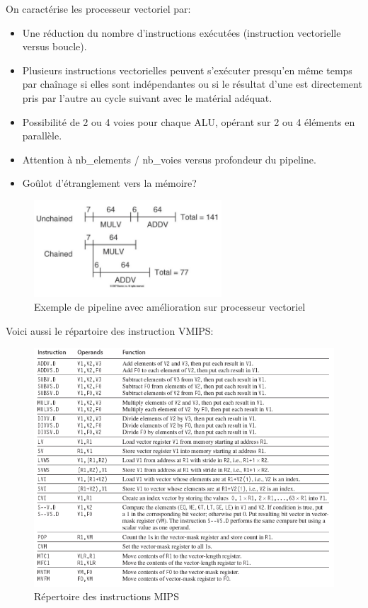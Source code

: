\documentclass[oneside]{book}
\begin{document}
On caractérise les processeur vectoriel par:
\begin{itemize}
\item Une réduction du nombre d'instructions exécutées (instruction vectorielle
versus boucle).

\item Plusieurs instructions vectorielles peuvent s'exécuter presqu'en même
temps par chaînage si elles sont indépendantes ou si le résultat d'une est
directement pris par l'autre au cycle suivant avec le matérial adéquat.

\item Possibilité de 2 ou 4 voies pour chaque ALU, opérant sur 2 ou 4 éléments
en parallèle.

\item Attention à nb\_elements / nb\_voies versus profondeur du pipeline.
\item Goûlot d'étranglement vers la mémoire?
\end{itemize}

\begin{figure}[!ht]
\centering
\includegraphics[width = 7cm]{exemple_pipeline.png}
\caption{Exemple de pipeline avec amélioration sur processeur vectoriel}
\label{fig:exemple_pipeline}
\end{figure}

Voici aussi le répartoire des instruction VMIPS:

\begin{figure}[!ht]
\centering
\includegraphics[width = \linewidth]{repertoire_mips.png}
\caption{Répertoire des instructions MIPS}
\label{fig:repertoire_mips}
\end{figure}
\end{document}
